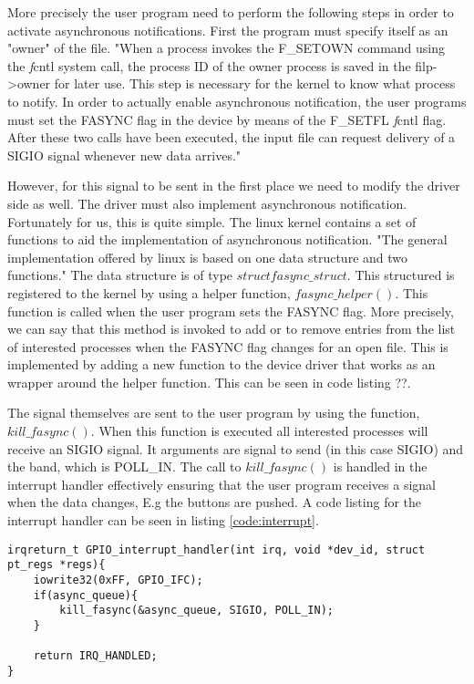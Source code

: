 More precisely the user program need to perform the following steps in order to activate asynchronous notifications. First the program must specify itself as an "owner" of the file. "When a process invokes the F\_SETOWN command using the {\emph fcntl} system call, the process ID of the owner process is saved in the filp->owner for later use. This step is necessary for the kernel to know what process to notify. In order to actually enable asynchronous notification, the user programs must set the FASYNC flag in the device by means of the F\_SETFL {\emph fcntl} flag. After these two calls have been executed, the input file can request delivery of a SIGIO signal whenever new data arrives."

However, for this signal to be sent in the first place we need to modify the driver side as well. The driver must also implement asynchronous notification. Fortunately for us, this is quite simple. The linux kernel contains a set of functions to aid the implementation of asynchronous notification. "The general implementation offered by linux is based on one data structure and two functions." The data structure is of type $struct fasync\_struct$. This structured  is registered to the kernel by using a helper function, $fasync\_helper()$. This function is called when the user program sets the FASYNC flag. More precisely, we can say that this method is invoked to add or to remove entries from the list of interested processes when the FASYNC flag changes for an open file. This is implemented by adding a new function to the device driver that works as an wrapper around the helper function. This can be seen in code listing ??.

The signal themselves are sent to the user program by using the function, $kill\_fasync()$. When this function is executed all interested processes will receive an SIGIO signal. It arguments are signal to send (in this case SIGIO) and the band, which is POLL\_IN. The call to $kill\_fasync()$ is handled in the interrupt handler effectively ensuring that the user program receives a signal when the data changes, E.g the buttons are pushed. A code listing for the interrupt handler can be seen in listing \ref{code:interrupt}.


\begin{lstlisting}[caption=Interrupt handler, label=code:interrupt]
irqreturn_t GPIO_interrupt_handler(int irq, void *dev_id, struct pt_regs *regs){
    iowrite32(0xFF, GPIO_IFC);
    if(async_queue){
        kill_fasync(&async_queue, SIGIO, POLL_IN);
    }
    
    return IRQ_HANDLED;
}
\end{lstlisting}




 









